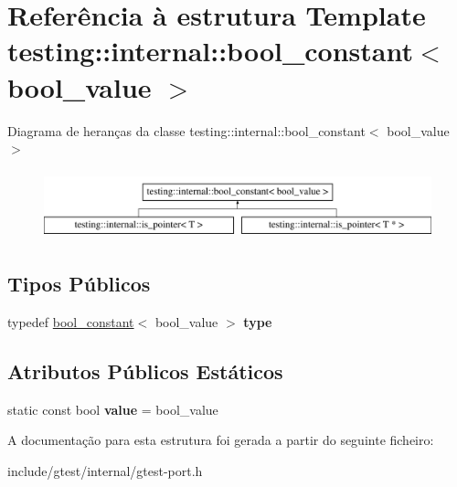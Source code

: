 \hypertarget{structtesting_1_1internal_1_1bool__constant}{\section{Referência à estrutura Template testing\-:\-:internal\-:\-:bool\-\_\-constant$<$ bool\-\_\-value $>$}
\label{structtesting_1_1internal_1_1bool__constant}
}
Diagrama de heranças da classe testing\-:\-:internal\-:\-:bool\-\_\-constant$<$ bool\-\_\-value $>$\begin{figure}[H]
\begin{center}
\leavevmode
\includegraphics[height=2.000000cm]{structtesting_1_1internal_1_1bool__constant}
\end{center}
\end{figure}
\subsection*{Tipos Públicos}
\begin{DoxyCompactItemize}
\item 
\hypertarget{structtesting_1_1internal_1_1bool__constant_aba6d09ecf7eecea6c93480f0d627a167}{typedef \hyperlink{structtesting_1_1internal_1_1bool__constant}{bool\-\_\-constant}$<$ bool\-\_\-value $>$ {\bfseries type}}\label{structtesting_1_1internal_1_1bool__constant_aba6d09ecf7eecea6c93480f0d627a167}

\end{DoxyCompactItemize}
\subsection*{Atributos Públicos Estáticos}
\begin{DoxyCompactItemize}
\item 
\hypertarget{structtesting_1_1internal_1_1bool__constant_a499fba6576296b04d99690a486424b32}{static const bool {\bfseries value} = bool\-\_\-value}\label{structtesting_1_1internal_1_1bool__constant_a499fba6576296b04d99690a486424b32}

\end{DoxyCompactItemize}


A documentação para esta estrutura foi gerada a partir do seguinte ficheiro\-:\begin{DoxyCompactItemize}
\item 
include/gtest/internal/gtest-\/port.\-h\end{DoxyCompactItemize}
